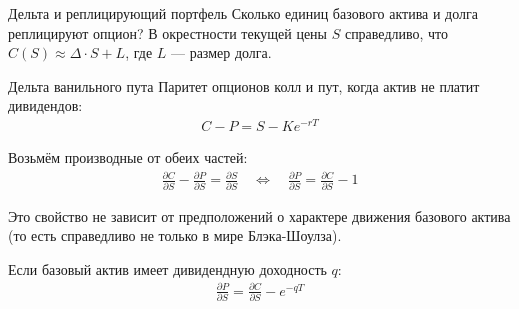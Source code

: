 \documentclass{beamer}
\begin{document}
\begin{frame}{Дельта и реплицирующий портфель}
\justify
Сколько единиц базового актива и долга реплицируют опцион? В окрестности текущей цены $S$ справедливо, что $C(S) \approx \Delta \cdot S + L$, где $L$ --- размер долга.

\justify
\centering
{}
\end{frame}



\begin{frame}{Дельта ванильного пута}
\justify
Паритет опционов колл и пут, когда актив не платит дивидендов:
\begin{align*}
C - P = S - Ke^{-rT}
\end{align*}

\justify
Возьмём производные от обеих частей:
\begin{align*}
\frac{\partial C}{\partial S} - \frac{\partial P}{\partial S} = \frac{\partial S}{\partial S} \quad \Leftrightarrow \quad \frac{\partial P}{\partial S} = \frac{\partial C}{\partial S} - 1
\end{align*}

\justify
Это свойство не зависит от предположений о характере движения базового актива (то есть
справедливо не только в мире Блэка-Шоулза).

\justify
Если базовый актив имеет дивидендную доходность $q$:
\begin{align*}
\frac{\partial P}{\partial S} = \frac{\partial C}{\partial S} - e^{-qT}
\end{align*}
\end{frame}
\end{document}
